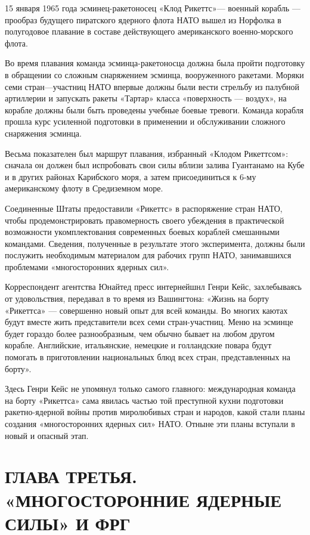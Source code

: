 \documentclass[12pt, a4paper, openany]{book}
\begin{document}
	15 января 1965 года эсминец-ракетоносец «Клод Рикеттс»— военный корабль — прообраз будущего пиратского ядерного флота НАТО вышел из Норфолка в полугодовое плавание в составе действующего американского военно-морского флота.
	
	Во время плавания команда эсминца-ракетоносца должна была пройти подготовку в обращении со сложным снаряжением эсминца, вооруженного ракетами. Моряки семи стран—участниц НАТО впервые должны были вести стрельбу из палубной артиллерии и запускать ракеты «Тартар» класса «поверхность — воздух», на корабле должны были быть проведены учебные боевые тревоги. Команда корабля прошла курс усиленной подготовки в применении и обслуживании сложного снаряжения эсминца.
	
	Весьма показателен был маршрут плавания, избранный «Клодом Рикеттсом»: сначала он должен был испробовать свои силы вблизи залива Гуантанамо на Кубе и в других районах Карибского моря, а затем присоединиться к 6-му американскому флоту в Средиземном море.
	
	Соединенные Штаты предоставили «Рикеттс» в распоряжение стран НАТО, чтобы продемонстрировать правомерность своего убеждения в практической возможности укомплектования современных боевых кораблей смешанными командами. Сведения, полученные в результате этого эксперимента, должны были послужить необходимым материалом для рабочих групп НАТО, занимавшихся проблемами «многосторонних ядерных сил».
	
	Корреспондент агентства Юнайтед пресс интернейшнл Генри Кейс, захлебываясь от удовольствия, передавал в то время из Вашингтона: «Жизнь на борту «Рикеттса» — совершенно новый опыт для всей команды. Во многих каютах будут вместе жить представители всех семи стран-участниц. Меню на эсминце будет гораздо более разнообразным, чем обычно бывает на любом другом корабле. Английские, итальянские, немецкие и голландские повара будут помогать в приготовлении национальных блюд всех стран, представленных на борту».
	
	Здесь Генри Кейс не упомянул только самого главного: международная команда на борту «Рикеттса» сама явилась частью той преступной кухни подготовки ракетно-ядерной войны против миролюбивых стран и народов, какой стали планы создания «многосторонних ядерных сил» НАТО. Отныне эти планы вступали в новый и опасный этап.
	
			\newpage
	\section[Глава третья. «МНОГОСТОРОННИЕ ЯДЕРНЫЕ СИЛЫ» И ФРГ]{\center ГЛАВА ТРЕТЬЯ.\\ \textbf{«МНОГОСТОРОННИЕ ЯДЕРНЫЕ СИЛЫ» И ФРГ}}	
\end{document}
